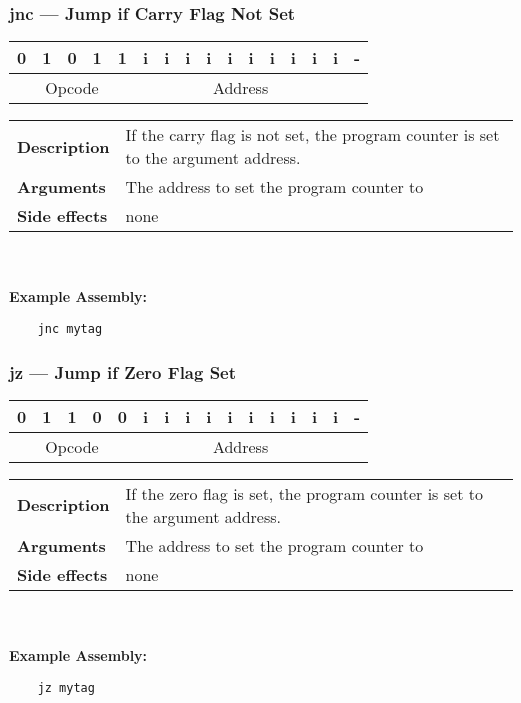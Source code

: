 \documentclass[titlepage]{article}
\begin{document}
\subsubsection{jnc --- Jump if Carry Flag Not Set}\begin{center}
\begin{tabular}{|c|c|c|c|c|c|c|c|c|c|c|c|c|c|c|c|}
\hline
0 & 1 & 0 & 1 & 1 & i & i & i & i & i & i & i & i & i & i & - \\
\hline
\multicolumn{5}{|c}{Opcode} &
\multicolumn{10}{|c}{Address} &
\multicolumn{1}{|c|}{} \\
\hline
\end{tabular}
\end{center}

\begin{tabular}{l p{8cm}}
{\bf Description} & If the carry flag is not set, the program counter is set to the argument address. \\
{\bf Arguments} & The address to set the program counter to \\
{\bf Side effects} & none \\
\end{tabular}\\ \\
{\bf Example Assembly:}
\begin{verbatim}
    jnc mytag
\end{verbatim}

\subsubsection{jz --- Jump if Zero Flag Set}\begin{center}
\begin{tabular}{|c|c|c|c|c|c|c|c|c|c|c|c|c|c|c|c|}
\hline
0 & 1 & 1 & 0 & 0 & i & i & i & i & i & i & i & i & i & i & - \\
\hline
\multicolumn{5}{|c}{Opcode} &
\multicolumn{10}{|c}{Address} &
\multicolumn{1}{|c|}{} \\
\hline
\end{tabular}
\end{center}

\begin{tabular}{l p{8cm}}
{\bf Description} & If the zero flag is set, the program counter is set to the argument address. \\
{\bf Arguments} & The address to set the program counter to \\
{\bf Side effects} & none \\
\end{tabular}\\ \\
{\bf Example Assembly:}
\begin{verbatim}
    jz mytag
\end{verbatim}
\end{document}
